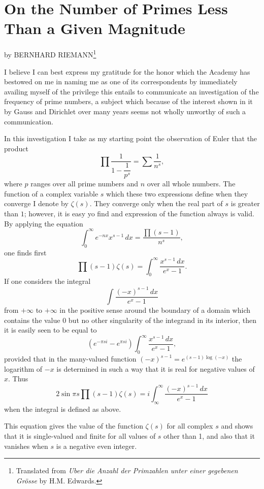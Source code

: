 \appendix

\chapter{On the Number of Primes Less Than a Given Magnitude}

\begin{flushleft}
\rightskip=0.5cm
by BERNHARD RIEMANN\footnote{Translated from \textit{Uber die Anzahl der Primzahlen unter einer gegebenen Grösse} by H.M. Edwards.}
\end{flushleft}

I believe I can best express my gratitude for the honor which the Academy 
has bestowed on me in naming me as one of its correspondents by immediately 
availing myself of the privilege this entails to communicate an investigation
of the frequency of prime numbers, a subject which because of the interest
shown in it by Gauss and Dirichlet over many years seems not wholly unworthy
of such a communication.

In this investigation I take as my starting point the observation of Euler
that the product
%
\[
\prod \frac{1}{1 - \dfrac{1}{p^s}} = \sum \frac{1}{n^s},
\]
%
where $p$ ranges over all prime numbers and $n$ over all whole numbers. The
function of a complex variable $s$ which these two expressions define when they
converge I denote by $\zeta(s)$. They converge only when the real part of $s$
is greater than $1$; however, it is easy yo find and expression of the function
always is valid. By applying the equation
%
\[
\int_0^{\infty} e^{-nx}x^{s-1} \, dx = \frac{\prod(s-1)}{n^s},
\]
%
one finds first
%
\[
\prod(s-1)\zeta(s) = \int_0^{\infty} \frac{x^{s-1}\, dx}{e^x - 1}.
\]
%
If one considers the integral
%
\[
\int \frac{(-x)^{s-1} \, dx}{e^x - 1}
\]
%
from $+\infty$ to $+\infty$ in the positive sense around the boundary
of a domain which contains the value 0 but no other singularity of the
integrand in its interior, then it is easily seen to be equal to
%
\[
(e^{-\pi si} - e^{\pi si})\int_0^{\infty} \frac{x^{s-1} \, dx}{e^x - 1},
\]
%
provided that in the many-valued function $(-x)^{s-1} = e^{(s-1)\log(-x)}$
the logarithm of $-x$ is determined in such a way that it is real for negative
values of $x$. Thus
%
\[
2\sin\pi s\prod(s-1)\zeta(s) 
= i \int_{\infty}^{\infty} \frac{(-x)^{s-1} \, dx}{e^x - 1}
\]
%
when the integral is defined as above.

This equation gives the value of the function $\zeta(s)$ for all complex
$s$ and shows that it is single-valued and finite for all values of $s$
other than 1, and also that it vanishes when $s$ is a negative even integer.

